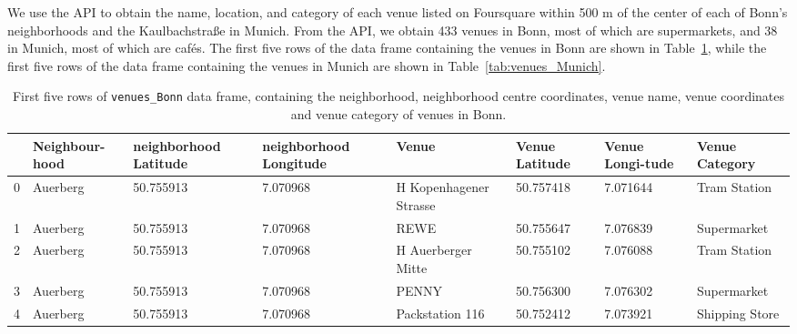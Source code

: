 \documentclass[UKenglish]{scrreprt}
\begin{document}
We use the API to obtain the name, location, and category of each venue listed on Foursquare within 500 m of the center of each of Bonn's neighborhoods and the Kaulbachstraße in Munich. From the API, we obtain 433 venues in Bonn, most of which are supermarkets, and 38 in Munich, most of which are cafés. The first five rows of the data frame containing the venues in Bonn are shown in Table~\ref{tab:venues_Bonn}, while the first five rows of the data frame containing the venues in Munich are shown in Table~\ref{tab:venues_Munich}.

\begin{table}
	\caption{First five rows of \texttt{venues\_Bonn} data frame, containing the neighborhood, neighborhood centre coordinates, venue name, venue coordinates and venue category of venues in Bonn.}
	\label{tab:venues_Bonn}
\begin{tabular}{lp{1.5cm}p{2.2cm}p{2.2cm}p{1.5cm}p{1.5cm}p{1.5cm}p{1.5cm}}
	\toprule
	{} & Neighbour-hood &  neighborhood Latitude &  neighborhood Longitude &                   Venue &  Venue Latitude &  Venue Longi-tude &  Venue Category \\
	\midrule
	0 &     Auerberg &              50.755913 &                7.070968 &  H Kopenhagener Strasse &       50.757418 &         7.071644 &    Tram Station \\
	1 &     Auerberg &              50.755913 &                7.070968 &                    REWE &       50.755647 &         7.076839 &     Supermarket \\
	2 &     Auerberg &              50.755913 &                7.070968 &      H Auerberger Mitte &       50.755102 &         7.076088 &    Tram Station \\
	3 &     Auerberg &              50.755913 &                7.070968 &                   PENNY &       50.756300 &         7.076302 &     Supermarket \\
	4 &     Auerberg &              50.755913 &                7.070968 &         Packstation 116 &       50.752412 &         7.073921 &  Shipping Store \\
	\bottomrule
\end{tabular}
\end{table}
\end{document}
